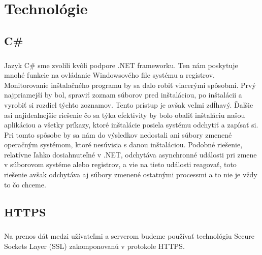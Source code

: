 \chapter{Technológie}

\section{C\#}
\paragraph{}
Jazyk C\# sme zvolili kvôli podpore .NET frameworku. Ten nám poskytuje mnohé funkcie na ovládanie Windowsového file systému a registrov. Monitorovanie inštalačného programu by sa dalo robiť viacerými spôsobmi. Prvý najpriamejší by bol, spraviť zoznam súborov pred inštaláciou, po inštalácii a vyrobiť si rozdiel týchto zoznamov. Tento prístup je avšak veľmi zdĺhavý. Ďalšie asi najidealnejšie riešenie čo sa týka efektivity by bolo obaliť inštaláciu našou aplikáciou a všetky príkazy, ktoré inštalácie posiela systému odchytiť a zapísať si. Pri tomto spôsobe by sa nám do výsledkov nedostali ani súbory zmenené operačným systémom, ktoré nesúvisia s danou inštaláciou. Podobné riešenie, relatívne ľahko dosiahnuteľné v .NET, odchytáva asynchronné události pri zmene v súborovom systéme alebo registrov, a vie na tieto události reagovať, toto riešenie avšak odchytáva aj súbory zmenené ostatnými processmi a to nie je vždy to čo chceme.

\section{HTTPS}
\paragraph{}
Na prenos dát medzi užívateľmi a serverom budeme používať technológiu Secure Sockets Layer (SSL) zakomponovanú v protokole HTTPS. 